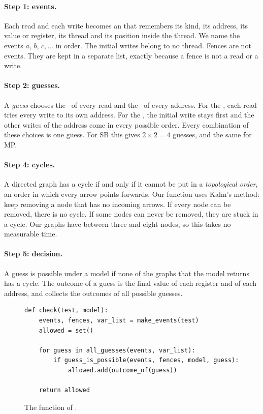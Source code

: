 \paragraph{Step 1: events.} Each read and each write becomes an  that remembers its kind, its address, its value or register, its thread and its position inside the thread. We name the events $a$, $b$, $c, \dots$ in order. The initial writes belong to no thread. Fences are not events. They are kept in a separate list, exactly because a fence is not a read or a write.

\paragraph{Step 2: guesses.} A \emph{guess} chooses the \rf\ of every read and the \co\ of every address. For the \rf, each read tries every write to its own address. For the \co, the initial write stays first and the other writes of the address come in every possible order. Every combination of these choices is one guess. For SB this gives $2 \times 2 = 4$ guesses, and the same for MP.

\paragraph{Step 4: cycles.} A directed graph has a cycle if and only if it cannot be put in a \emph{topological order}, an order in which every arrow points forwards. Our function uses Kahn's method: keep removing a node that has no incoming arrows. If every node can be removed, there is no cycle. If some nodes can never be removed, they are stuck in a cycle. Our graphs have between three and eight nodes, so this takes no measurable time.

\paragraph{Step 5: decision.} A guess is possible under a model if none of the graphs that the model returns has a cycle. The outcome of a guess is the final value of each register and of each address, and  collects the outcomes of all possible guesses.

\begin{figure}[!htbp]
\centering
\begin{lstlisting}[style=vspython]
def check(test, model):
    events, fences, var_list = make_events(test)
    allowed = set()

    for guess in all_guesses(events, var_list):
        if guess_is_possible(events, fences, model, guess):
            allowed.add(outcome_of(guess))

    return allowed
\end{lstlisting}
\caption{The function  of .}
\label{fig:checkcode}
\end{figure}

